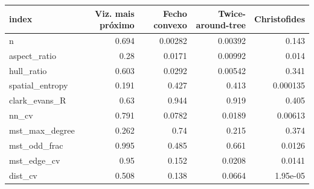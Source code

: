 \begin{tabular}{lrrrr}
\hline
index & Viz. mais próximo & Fecho convexo & Twice-around-tree & Christofides \\
\hline
n & 0.694 & 0.00282 & 0.00392 & 0.143 \\
aspect\_ratio & 0.28 & 0.0171 & 0.00992 & 0.014 \\
hull\_ratio & 0.603 & 0.0292 & 0.00542 & 0.341 \\
spatial\_entropy & 0.191 & 0.427 & 0.413 & 0.000135 \\
clark\_evans\_R & 0.63 & 0.944 & 0.919 & 0.405 \\
nn\_cv & 0.791 & 0.0782 & 0.0189 & 0.00613 \\
mst\_max\_degree & 0.262 & 0.74 & 0.215 & 0.374 \\
mst\_odd\_frac & 0.995 & 0.485 & 0.661 & 0.0126 \\
mst\_edge\_cv & 0.95 & 0.152 & 0.0208 & 0.0141 \\
dist\_cv & 0.508 & 0.138 & 0.0664 & 1.95e-05 \\
\hline
\end{tabular}
